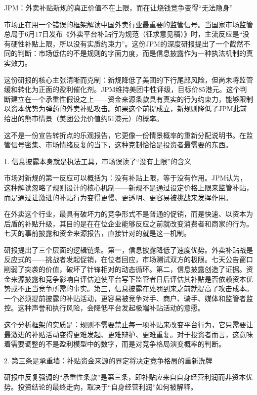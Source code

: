 \documentclass[11pt]{ctexart}
\begin{document}
JPM：外卖补贴新规的真正价值不在上限，而在让烧钱竞争变得“无法隐身”

市场正在用一个错误的框架解读中国外卖行业最重要的监管信号。当国家市场监管总局于6月17日发布《外卖平台补贴行为规范（征求意见稿）》时，主流反应是“没有硬性补贴上限，所以没有实质约束力”。这份JPM的深度研报提出了一个截然不同的判断：市场低估的不是规则的字面力度，而是信息披露作为一种执法机制的真实效力。

这份研报的核心主张清晰而克制：新规降低了美团的下行尾部风险，但尚未将监管缓和转化为正面的盈利催化剂。JPM维持美团中性评级，目标价85港元。这个判断建立在一个承重性假设之上——资金来源条款具有真实的行为约束力，能够限制以资本优势为弹药的外卖补贴攻击。如果这个前提成立，新规则降低了JPM此前给出的熊市情景（美团公允价值约51港元）的概率。

这不是一份宣告转折点的乐观报告，它更像一份情景概率的重新分配说明书。在监管信号密集、市场情绪反复的当下，这种克制恰恰是投资者最需要的东西。

1. 信息披露本身就是执法工具，市场误读了“没有上限”的含义

市场对新规的第一反应可以概括为：没有补贴上限，等于没有作用。JPM认为，这种解读忽略了规则设计的核心机制——新规不是通过设定价格上限来监管补贴，而是通过让激进的补贴行为变得更慢、更透明、更容易被挑战来发挥作用。

在外卖这个行业，最具有破坏力的竞争形式不是普通的促销，而是快速、以资本为后盾的补贴升级，其目的是在在位企业能够反应之前就改变消费者和商家的行为。七天的事前披露和资金来源报告，直接针对的就是这一机制。

研报提出了三个层面的逻辑链条。第一，信息披露降低了速度优势。外卖补贴战是反应式的——挑战者发起促销，在位者回应，市场测试双方的极限。七天公告窗口削弱了突袭的价值，破坏了针锋相对的动态循环。第二，信息披露创造了证据。资金来源披露和竞争影响自评估迫使平台写下监管者日后评估其补贴是否依赖资本优势或不正当竞争所需的事实。第三，信息披露在处罚到来之前就提高了攻击成本。一个必须提前披露的补贴活动，更容易被竞争对手、商户、骑手、媒体和监管者监控。这种声誉和执行风险，会降低平台发起极端补贴活动的意愿。

这个分析框架的实质是：规则不需要禁止每一项补贴来改变平台行为，它只需要让最激进的补贴活动变得更难发起、更难辩护、更难重复。对于投资者而言，这意味着需要调整的不是盈利模型中的数字，而是对竞争格局演变概率的判断。

2. 第三条是承重墙：补贴资金来源的界定将决定竞争格局的重新洗牌

研报中反复强调的“承重性条款”是第三条，即补贴应来自自身经营利润而非资本优势。投资结论的最终走向，取决于“自身经营利润”如何被解释。
\end{document}
